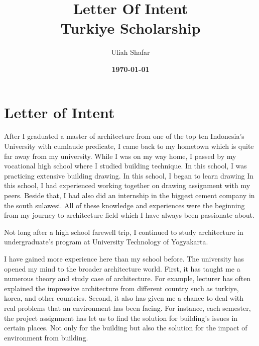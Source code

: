 \documentclass[12pt]{simart} %
\title{
\textbf{Letter Of Intent}\\
{Turkiye Scholarship} \\
} %
\date{\textbf{\today}}
\author{Uliah Shafar}
\begin{document}
\maketitle %

\vspace{30pt} %

\section{Letter of Intent}

After I graduated a master of architecture from one of the top ten Indonesia's University with cumlaude predicate, I came back to my hometown which is quite far away from my university.
While I was on my way home, I passed by my vocational high school where I studied building technique.
In this school, I was practicing extensive building drawing.
In this school, I began to learn drawing
In this school, I had experienced working together on drawing assignment with my peers.
Beside that, I had also did an internship in the biggest cement company in the south sulawesi. All of these knowledge and experiences were the beginning from my journey to architecture field which I have always been passionate about.

Not long after a high school farewell trip, I continued to study architecture in undergraduate's program at University Technology of Yogyakarta.

I have gained more experience here than my school before. The university has opened my mind to the broader architecture world.
First, it has taught me a numerous theory and study case of architecture.
For example, lecturer has often explained the impressive architecture from different country such as turkiye, korea, and other countries.
Second, it also has given me a chance to deal with real problems that an environment has been facing. For instance, each semester, the project assignment has let us to find the solution for building's issues in certain places. Not only for the building but also the solution for the impact of environment from building.
\end{document}
